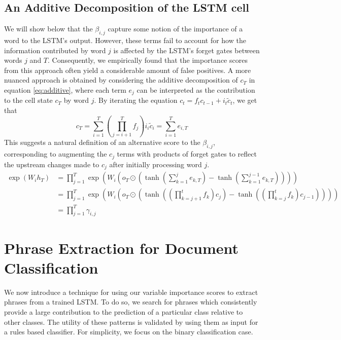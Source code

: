 \documentclass{article}
\begin{document}
\subsection{An Additive Decomposition of the LSTM cell}
\label{sec:additive}
We will show below that the $\beta_{i,j}$  capture some notion of the importance of a word to the LSTM's output.   However, these terms fail to account for how the information contributed by word $j$ is affected by the LSTM's forget gates between words $j$ and $T$. Consequently, we empirically found that the importance scores from this approach often yield a considerable amount of false positives. A more nuanced approach is obtained by considering the additive decomposition of $c_T$ in equation \eqref{eq:additive}, where each term $e_j$ can be interpreted as the contribution to the cell state $c_T$ by word $j$. By iterating the equation $c_t = f_tc_{t - 1} + i_t \tilde{c}_t$, we get that
\begin{equation}
c_T = \sum_{i=1}^T (\prod_{j=i + 1}^T f_j) i_i \tilde{c}_i = \sum_{i=1}^T e_{i, T} \label{eq:additive}
\end{equation}
This suggests a natural definition of an alternative score to the $\beta_{i, j}$, corresponding to augmenting the $c_j$ terms with products of forget gates to reflect the upstream changes made to $c_j$ after initially processing word $j$. 
\begin{align}
\label{eq:gamma}
\exp(W_i h_T) & = \prod_{j=1}^T \exp \left( W_i(o_T \odot (\tanh(\sum_{k = 1}^j e_{k, T}) - \tanh(\sum_{k=1}^{j - 1}e_{k, T})))\right) \\
& = \prod_{j=1}^T \exp \left( W_i(o_T \odot (\tanh((\prod_{k=j+1}^t f_k) c_j) - \tanh((\prod_{k=j}^t f_k) c_{j - 1}))) \right) \\
& = \prod_{j=1}^T \gamma_{i,j}
\end{align}
\section{Phrase Extraction for Document Classification}
We now introduce a technique for using our variable importance scores to extract phrases from a trained LSTM. To do so, we search for phrases which consistently provide a large contribution to the prediction of a particular class relative to other classes. The utility of these patterns is validated by using them as input for a rules based classifier. For simplicity, we focus on the binary classification case.
\end{document}
